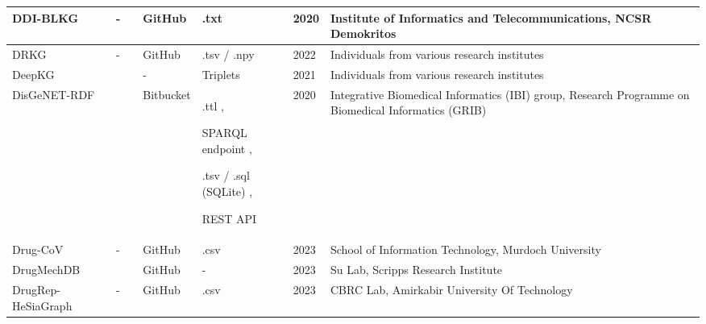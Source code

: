 \documentclass{article}
\begin{document}
\begin{landscape}
\begin{xltabular}{\textwidth}{p{3cm}|p{2.2cm}|p{2.2cm}|p{2.2cm}|p{2.2cm}|p{1cm}|p{6cm}}
\hline


DDI-BLKG
&
-
&
\cite{ddiblkg_publication}
&
GitHub
\cite{ddiblkg_github}
&
.txt
\cite{ddiblkg_data}
&
2020
&
Institute of Informatics and Telecommunications, NCSR Demokritos
\cite{ddiblkg_group}
\\


\hline


DRKG
&
-
&
\cite{drkg_publication}
&
GitHub
\cite{drkg_github}
&
.tsv / .npy
\cite{drkg_data}
&
2022
&
Individuals from various research institutes
\\


\hline


DeepKG
&
\cite{deepkg_website}
&
\cite{deepkg_publication}
&
-
&
Triplets
\cite{deepkg_website}
&
2021
&
Individuals from various research institutes
\\


\hline


DisGeNET-RDF
&
\cite{disgenet_website1}
\cite{disgenet_website2}
&
\cite{disgenet_publication1}
\cite{disgenet_publication2}
\cite{disgenet_publication3}
&
Bitbucket
\cite{disgenet_bitbucket1}
\cite{disgenet_bitbucket2}
&
.ttl
\cite{disgenet_data1},

SPARQL endpoint
\cite{disgenet_data2}
\cite{disgenet_data3},

.tsv / .sql (SQLite)
\cite{disgenet_data4},

REST API
\cite{disgenet_data5}
&
2020
&
Integrative Biomedical Informatics (IBI) group, Research Programme on Biomedical Informatics (GRIB)
\cite{disgenet_group}
\\


\hline


Drug-CoV
&
-
&
\cite{drugcov_publication}
&
GitHub
\cite{drugcov_github}
&
.csv
\cite{drugcov_data}
&
2023
&
School of Information Technology, Murdoch University
\cite{drugcov_group}
\\


\hline


DrugMechDB
&
\cite{drugmechdb_website}
&
\cite{drugmechdb_publication1}
\cite{drugmechdb_publication2}
&
GitHub
\cite{drugmechdb_github}
&
-
&
2023
&
Su Lab, Scripps Research Institute
\cite{drugmechdb_group}
\\


\hline


DrugRep-HeSiaGraph
&
-
&
\cite{drugrephesiagraph_publication}
&
GitHub
\cite{drugrephesiagraph_github}
&
.csv
\cite{drugrephesiagraph_github}
&
2023
&
CBRC Lab, Amirkabir University Of Technology
\cite{drugrepkg_group}
\\



\end{xltabular}
\end{landscape}
\end{document}

